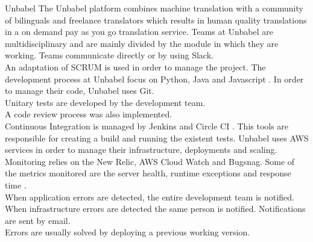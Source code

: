     \begin{companyreport}{Unbabel}
      \product
      The Unbabel platform combines machine translation with a community of bilinguals and freelance translators which results in human quality translations in a on demand pay as you go translation service.
      \teams
      Teams at Unbabel are multidisciplinary and are mainly divided by the module in which they are working. Teams communicate directly or by using Slack.\\
      An adaptation of SCRUM is used in order to manage the project.
      \development
      The development process at Unbabel focus on Python, Java and Javascript . In order to manage their code, Unbabel uses Git.\\
      Unitary tests are developed by the development team. \\
      A code review process was also implemented. \\
      Continuous Integration is managed by Jenkins and Circle CI . This tools are  responsible for creating a build and running the existent tests.
      \operations
      Unbabel uses AWS services in order to manage their infrastructure, deployments and scaling.\\
      Monitoring relies on the New Relic, AWS Cloud Watch and Bugsnag. Some of the metrics monitored are the server health, runtime exceptions and response time . \\
      When application errors are detected, the entire development team is notified. When infrastructure errors are detected the same person is notified. Notifications are sent by email.\\
      Errors are usually solved by deploying a previous working version.
      \reportend
    \end{companyreport}

